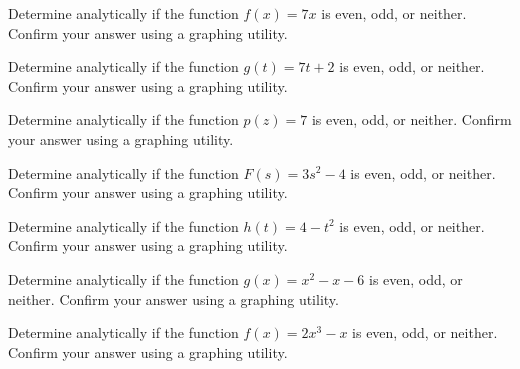\documentclass{ximera}
\begin{document}
\begin{problem}\label{evenoddornotpolyfirst}
Determine analytically if the function $f(x) = 7x$ is even, odd, or neither.  Confirm your answer using a graphing utility.  

\end{problem}

\begin{problem}
Determine analytically if the function $g(t) = 7t + 2$ is even, odd, or neither.  Confirm your answer using a graphing utility.  


\end{problem}
 
\begin{problem}
Determine analytically if the function $p(z) = 7$ is even, odd, or neither.  Confirm your answer using a graphing utility.  

\end{problem}

\begin{problem}
Determine analytically if the function $F(s) = 3s^2 - 4$ is even, odd, or neither.  Confirm your answer using a graphing utility.  


\end{problem}

\begin{problem}
Determine analytically if the function $h(t) = 4-t^2$ is even, odd, or neither.  Confirm your answer using a graphing utility. 

\end{problem} 

\begin{problem}
Determine analytically if the function $g(x) = x^2-x-6$ is even, odd, or neither.  Confirm your answer using a graphing utility.  


\end{problem} 

\begin{problem}
Determine analytically if the function $f(x) = 2x^3 - x$ is even, odd, or neither.  Confirm your answer using a graphing utility.  

\end{problem} 
\end{document}
